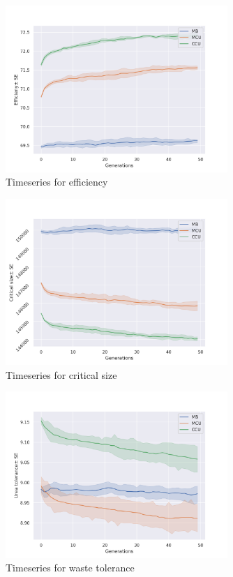 \begin{figure}[p]
  \centering
  \includegraphics[trim = 0 0 50 50, clip, width=0.75\textwidth]{C4/Figs/eff}
  \caption{Timeseries for efficiency}
  \label{eff}
\end{figure}
\begin{figure}[p]
  \centering
  \includegraphics[trim = 0 0 50 50, clip, width=0.75\textwidth]{C4/Figs/mc}
  \caption{Timeseries for critical size}
  \label{mc}
\end{figure}

\newpage

\begin{figure}[t]
  \centering
  \includegraphics[trim = 0 0 50 50, clip, width=0.75\textwidth]{C4/Figs/wtol}
  \caption{Timeseries for waste tolerance}
  \label{wtol}
\end{figure}
